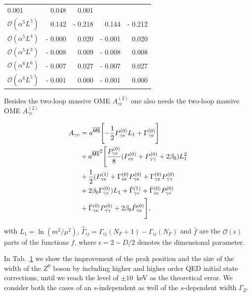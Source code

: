 \begin{table}
{\begin{tabular}{l|r|r|r|r}
0.001  &     0.048  &     0.001 \\
    $\mathcal{O}(\alpha^5 L^5)$                       &      0.142  & -  
0.218  &     0.144  & -  0.212 \\
    $\mathcal{O}(\alpha^5 L^4)$                       & -   0.000  &     
0.020  & -  0.001  &     0.020 \\
    $\mathcal{O}(\alpha^5 L^3)$                       & -   0.008  &     
0.009  & -  0.008  &     0.008 \\
    $\mathcal{O}(\alpha^6 L^6)$                       & -   0.007  &     
0.027  & -  0.007  &     0.027 \\
    $\mathcal{O}(\alpha^6 L^5)$                       & -   0.001  &     
0.000  & -  0.001  &     0.000 \\
    \end{tabular}}
    \label{TAB1}
    \end{table}

Besides the two-loop massive OME $A_{ee}^{(2)}$ \cite{Blumlein:2011mi} one also needs the two-loop massive OME 
$A_{\gamma e}^{(2)}$ \cite{Ablinger:2020qvo}

    \begin{align}
A_{\gamma e} &= a^{\sf \overline{MS}}
\Biggl[-\frac{1}{2} P_{\gamma e}^{(0)} L_1 
+ \Gamma_{\gamma e}^{(0)}\Biggr] \nonumber\\
& + {a^{\sf \overline{MS}}}^2
\Biggl[
\frac{P_{\gamma e}^{(0)}}{8} (  
P_{e e}^{(0)} +  
P_{\gamma \gamma}^{(0)} + 2 \beta_0) L_1^2
\nonumber\\ &
+ \frac{1}{2} ( P_{\gamma e}^{(1)} 
+ \Gamma_{e e}^{(0)}  P_{\gamma e}^{(0)} 
+ \Gamma_{\gamma e}^{(0)}  P_{\gamma \gamma}^{(0)}  
\nonumber \\
&+ 2 \beta_0 \Gamma_{\gamma e}^{(0)} ) L_1   
+ \hat{\Gamma}_{\gamma e}^{(1)}  
+ \bar{\Gamma}_{e e}^{(0)} P_{\gamma e}^{(0)}  
\nonumber\\ &
+ \bar{\Gamma}_{\gamma e}^{(0)} P_{\gamma \gamma}^{(0)}  
+ 2 \beta_0 \bar{P}_{\gamma e}^{(0)} 
\Biggr],
\end{align}


\noindent
with $L_1 = \ln(m^2/\mu^2)$, $\hat{\Gamma}_{ij} =
\Gamma_{ij}(N_F+1) - \Gamma_{ij}(N_F)$ and $\bar{f}$ are the 
$\mathcal{O}(\epsilon)$ parts of the functions $f$, where $\epsilon = 2 - D/2$ denotes 
the dimensional parameter. 

In Tab.~\ref{TAB1} we show the improvement of the peak position and the size of the width of the 
$Z^0$ boson by including higher and higher order QED initial state corrections, until we reach the 
level of $\pm 10$~keV as the theoretical error. We consider both the cases of an $s$-independent 
as well of the $s$-dependent width $\Gamma_Z$.


